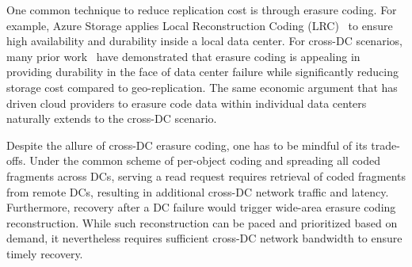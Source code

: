  One common technique to reduce
replication cost is through erasure coding. For example, Azure Storage applies
Local Reconstruction Coding (LRC)~\cite{huang12erasure} to ensure high
availability and durability inside a local data center. For cross-DC scenarios,
many prior work~\cite{oceanstore:asplos00, pond:fast03, weatherspoon05long,
  hail:ccs09, racs:socc10, hu12nccloud} have demonstrated that erasure coding is
appealing in providing durability in the face of data center failure while
significantly reducing storage cost compared to geo-replication. The same
economic argument that has driven cloud providers to erasure code data within
individual data centers naturally extends to the cross-DC scenario.


 Despite the allure of cross-DC
erasure coding, one has to be mindful of its trade-offs. Under the common scheme
of per-object coding and spreading all coded fragments across DCs,  serving a
read request requires retrieval of coded fragments from remote DCs, resulting in
additional cross-DC network traffic and latency. Furthermore, recovery after a
DC failure would trigger wide-area erasure coding reconstruction. While such
reconstruction can be paced and prioritized based on demand, it nevertheless
requires sufficient cross-DC network bandwidth to ensure timely recovery.

